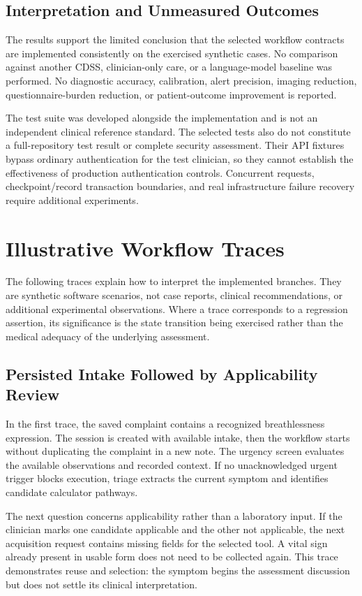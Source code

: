 \documentclass[conference]{IEEEtran}
\begin{document}
\subsection{Interpretation and Unmeasured Outcomes}
The results support the limited conclusion that the selected workflow contracts are implemented consistently on the exercised synthetic cases. No comparison against another CDSS, clinician-only care, or a language-model baseline was performed. No diagnostic accuracy, calibration, alert precision, imaging reduction, questionnaire-burden reduction, or patient-outcome improvement is reported.

The test suite was developed alongside the implementation and is not an independent clinical reference standard. The selected tests also do not constitute a full-repository test result or complete security assessment. Their API fixtures bypass ordinary authentication for the test clinician, so they cannot establish the effectiveness of production authentication controls. Concurrent requests, checkpoint/record transaction boundaries, and real infrastructure failure recovery require additional experiments.

\section{Illustrative Workflow Traces}
The following traces explain how to interpret the implemented branches. They are synthetic software scenarios, not case reports, clinical recommendations, or additional experimental observations. Where a trace corresponds to a regression assertion, its significance is the state transition being exercised rather than the medical adequacy of the underlying assessment.

\subsection{Persisted Intake Followed by Applicability Review}
In the first trace, the saved complaint contains a recognized breathlessness expression. The session is created with available intake, then the workflow starts without duplicating the complaint in a new note. The urgency screen evaluates the available observations and recorded context. If no unacknowledged urgent trigger blocks execution, triage extracts the current symptom and identifies candidate calculator pathways.

The next question concerns applicability rather than a laboratory input. If the clinician marks one candidate applicable and the other not applicable, the next acquisition request contains missing fields for the selected tool. A vital sign already present in usable form does not need to be collected again. This trace demonstrates reuse and selection: the symptom begins the assessment discussion but does not settle its clinical interpretation.
\end{document}
